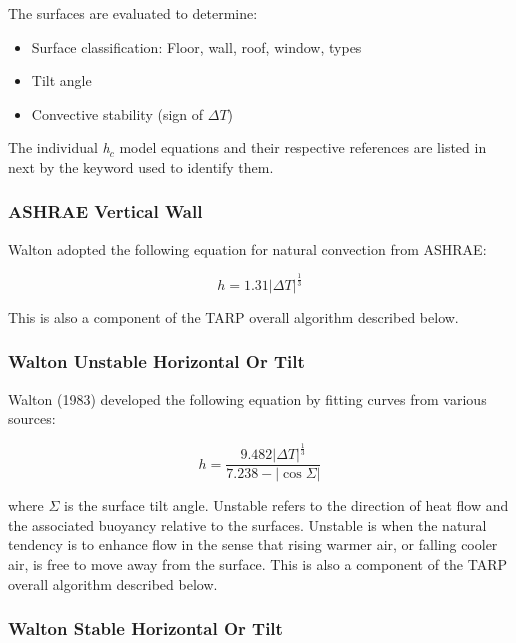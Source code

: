 The surfaces are evaluated to determine:

\begin{itemize}
\item
  Surface classification: Floor, wall, roof, window, types
\item
  Tilt angle
\item
  Convective stability (sign of \(\Delta T\))
\end{itemize}

The individual \emph{h\(_{c}\)} model equations and their respective references are listed in next by the keyword used to identify them.

\subsubsection{ASHRAE Vertical Wall}\label{ashrae-vertical-wall}

Walton adopted the following equation for natural convection from ASHRAE:

\begin{equation}
h = 1.31{\left| {\Delta T} \right|^{\frac{1}{3}}}
\end{equation}

This is also a component of the TARP overall algorithm described below.

\subsubsection{Walton Unstable Horizontal Or Tilt}\label{walton-unstable-horizontal-or-tilt}

Walton (1983) developed the following equation by fitting curves from various sources:

\begin{equation}
h = \frac{{9.482{{\left| {\Delta T} \right|}^{\frac{1}{3}}}}}{{7.238 - \left| {\cos \Sigma } \right|}}
\end{equation}

where $\Sigma$ is the surface tilt angle. Unstable refers to the direction of heat flow and the associated buoyancy relative to the surfaces. Unstable is when the natural tendency is to enhance flow in the sense that rising warmer air, or falling cooler air, is free to move away from the surface. This is also a component of the TARP overall algorithm described below.

\subsubsection{Walton Stable Horizontal Or Tilt}\label{walton-stable-horizontal-or-tilt}

